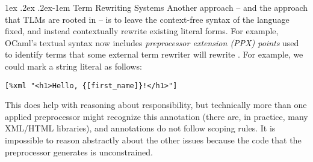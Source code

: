 \documentclass[acmsmall]{acmart}
\makeatletter
\renewcommand{\paragraph}{%
  \@startsection{paragraph}{4}%
  {\z@}{1ex \@plus .2ex \@minus .2ex}{-1em}%
  {\normalfont\normalsize\bfseries}%
}
\newcommand{\li}[1]{\lstinline[basicstyle=\ttfamily\fontsize{9pt}{1em}\selectfont]{#1}}
\makeatother
\begin{document}

\paragraph{Term Rewriting Systems}
Another approach -- and the approach that TLMs are rooted in -- is to leave the context-free syntax of the language fixed, and instead contextually rewrite existing literal forms. For example, OCaml's textual syntax now includes \emph{preprocessor extension (PPX) points} used to identify terms that some external term rewriter will rewrite \cite{ocaml-manual}. For example, we could  mark a string literal as follows:
\begin{lstlisting}[numbers=none]
    [%xml "<h1>Hello, {[first_name]}!</h1>"]
\end{lstlisting}
This does help with reasoning about responsibility, but technically more than one applied preprocessor might recognize this annotation (there are, in practice, many XML/HTML libraries), and annotations do not follow scoping rules. It is impossible to reason abstractly about the other issues because the code that the preprocessor generates is unconstrained.%
\end{document}
